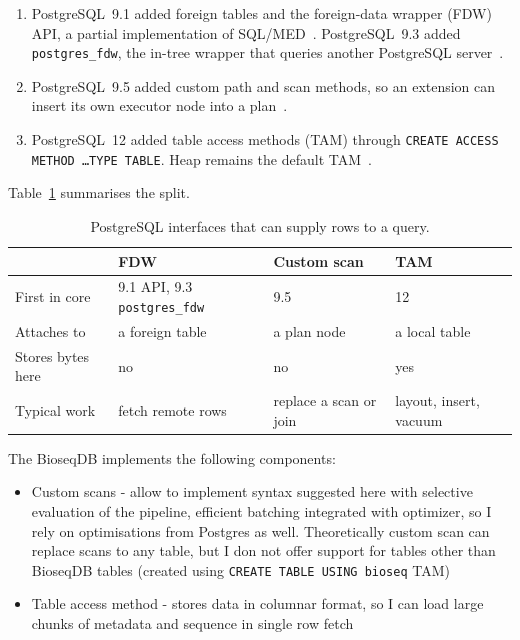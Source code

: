 \begin{enumerate}
  \item PostgreSQL~9.1 added foreign tables and the foreign-data wrapper (FDW) API, a partial implementation of SQL/MED~\autocite{postgresql91_release,postgresql17_ddl_foreign_data}.
        PostgreSQL~9.3 added \texttt{postgres\_fdw}, the in-tree wrapper that queries another PostgreSQL server~\autocite{postgresql93_release,postgresql17_postgres_fdw}.
  \item PostgreSQL~9.5 added custom path and scan methods, so an extension can insert its own executor node into a plan~\autocite{postgresql95_release,postgresql17_custom_scan}.
  \item PostgreSQL~12 added table access methods (TAM) through \texttt{CREATE ACCESS METHOD \ldots TYPE TABLE}.
        Heap remains the default TAM~\autocite{postgresql12_release,postgresql17_tableam}.
\end{enumerate}

Table~\ref{tab:pg-scan-extension-points} summarises the split.

\begin{table}[htbp]
\centering
\footnotesize
\caption{PostgreSQL interfaces that can supply rows to a query.}
\label{tab:pg-scan-extension-points}
\begin{tabular}{@{}p{}p{}p{}p{}@{}}
\toprule
 & FDW & Custom scan & TAM \\
\midrule
First in core
  & 9.1 API, 9.3 \texttt{postgres\_fdw}
  & 9.5
  & 12 \\
Attaches to
  & a foreign table
  & a plan node
  & a local table \\
Stores bytes here
  & no
  & no
  & yes \\
Typical work
  & fetch remote rows
  & replace a scan or join
  & layout, insert, vacuum \\
\bottomrule
\end{tabular}
\end{table}

The BioseqDB implements the following components:
\begin{itemize}
  \item Custom scans - allow to implement syntax suggested here with selective evaluation of the pipeline, efficient batching integrated with optimizer, so I rely on optimisations from Postgres as well.
  Theoretically custom scan can replace scans to any table, but I don not offer support for tables other than BioseqDB tables (created using \texttt{CREATE TABLE USING bioseq} TAM)
  \item Table access method - stores data in columnar format, so I can load large chunks of metadata and sequence in single row fetch
\end{itemize}

